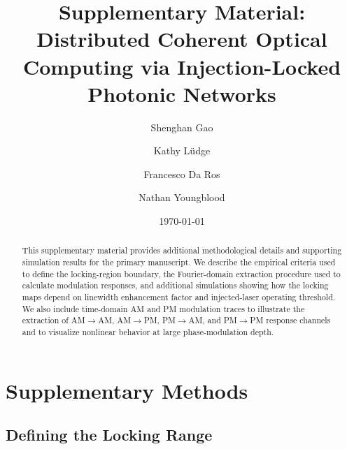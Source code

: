 \documentclass[
 aip,
 apl,
 amsmath,amssymb,
 preprint,
 floatfix,
]{revtex4-1}
\begin{document}
\title{Supplementary Material: Distributed Coherent Optical Computing via Injection-Locked Photonic Networks}

\author{Shenghan Gao}
\author{Kathy L\"udge}
\author{Francesco Da Ros}
\author{Nathan Youngblood}

\date{\today}

\begin{abstract}
This supplementary material provides additional methodological details and supporting simulation results for the primary manuscript. We describe the empirical criteria used to define the locking-region boundary, the Fourier-domain extraction procedure used to calculate modulation responses, and additional simulations showing how the locking maps depend on linewidth enhancement factor and injected-laser operating threshold. We also include time-domain AM and PM modulation traces to illustrate the extraction of AM$\rightarrow$AM, AM$\rightarrow$PM, PM$\rightarrow$AM, and PM$\rightarrow$PM response channels and to visualize nonlinear behavior at large phase-modulation depth.
\end{abstract}

\maketitle

\section{Supplementary Methods}

\subsection{Defining the Locking Range}
\end{document}
